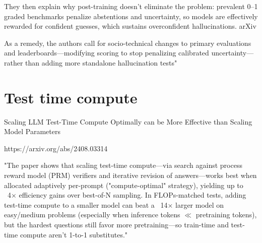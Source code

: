 They then explain why post-training doesn’t eliminate the problem: prevalent 0–1 graded benchmarks penalize abstentions and uncertainty, so models are effectively rewarded for confident guesses, which sustains overconfident hallucinations. 
arXiv

As a remedy, the authors call for socio-technical changes to primary evaluations and leaderboards—modifying scoring to stop penalizing calibrated uncertainty—rather than adding more standalone hallucination tests"

\section{Test time compute}

Scaling LLM Test-Time Compute Optimally can be More Effective than Scaling Model Parameters

https://arxiv.org/abs/2408.03314

"The paper shows that scaling test-time compute—via search against process reward model (PRM) verifiers and iterative revision of answers—works best when allocated adaptively per-prompt ("compute-optimal" strategy), yielding up to ~4× efficiency gains over best-of-N sampling. In FLOPs-matched tests, adding test-time compute to a smaller model can beat a ~14× larger model on easy/medium problems (especially when inference tokens $\ll$ pretraining tokens), but the hardest questions still favor more pretraining—so train-time and test-time compute aren't 1-to-1 substitutes."

\label{LR}
